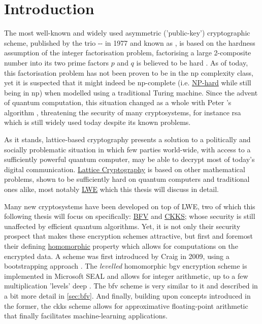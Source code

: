 \chapter{Introduction}
\label{chap:introduction}
The most well-known and widely used asymmetric ('public-key') cryptographic scheme, published by the trio -- in 1977 and known as , is based on the hardness assumption of the integer factorisation problem, factorising a large 2-composite number into its two prime factors $p$ and $q$ is believed to be hard \parencite{1983-rsa}.
As of today, this factorisation problem has not been proven to be in the \gls{np} complexity class, yet it is suspected that it might indeed be \gls{np}-complete (i.e. \hyperref[def:np-hard]{NP-hard} while still being in \gls{np}) when modelled using a traditional Turing machine.
Since the advent of quantum computation, this situation changed as a whole with Peter 's algorithm \parencite{1997-shors-algorithm}, threatening the security of many cryptosystems, for instance \gls{rsa} which is still widely used today despite its known problems.

As it stands, lattice-based cryptography presents a solution to a politically and socially problematic situation in which few parties world-wide, with access to a sufficiently powerful quantum computer, may be able to decrypt most of today's digital communication.
\hyperref[subsec:lattice-crypto]{Lattice Cryptography} is based on other mathematical problems, shown to be sufficiently hard on quantum computers and traditional ones alike, most notably \hyperref[def:lwe-search-problem]{LWE} \parencite{2005-lwe-original} which this thesis will discuss in detail.

Many new cryptosystems have been developed on top of LWE, two of which this following thesis will focus on specifically: \hyperref[def:bfv-scheme]{BFV} and \hyperref[def:ckks-scheme]{CKKS};
whose security is still unaffected by efficient quantum algorithms.
Yet, it is not only their security prospect that makes these encryption schemes attractive, but first and foremost their defining \hyperref[def:ring-homomorphism]{homomorphic} property which allows for computations on the encrypted data.
A  scheme was first introduced by Craig  in 2009, using a bootstrapping approach \parencite{2009-gentry-fhe-original}.
The \textit{levelled} homomorphic \gls{bgv} encryption scheme is implemented in Microsoft SEAL and allows for integer arithmetic, up to a few multiplication 'levels' deep \parencite{2012-bgv-original}.
The \gls{bfv} scheme \parencite{2012-fv-original,2012-brakerski} is very similar to it and described in a bit more detail in \cref{sec:bfv}.
And finally, building upon concepts introduced in the former, the \gls{ckks} scheme \parencite{2017-ckks-original} allows for approximative floating-point arithmetic that finally facilitates machine-learning applications.


